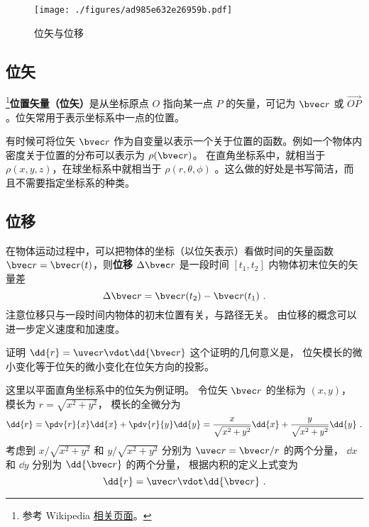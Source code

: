 

\begin{figure}[ht]
\centering
\texttt{[image: ./figures/ad985e632e26959b.pdf]}
\caption{位矢与位移} \label{fig_Disp_1}
\end{figure}

\subsection{位矢}

\footnote{参考 Wikipedia \href{https://en.wikipedia.org/wiki/Position_(geometry)}{相关页面}。}\textbf{位置矢量（位矢）}是从坐标原点 $O$ 指向某一点 $P$ 的矢量，可记为 $\bvec r$ 或 $\overrightarrow{OP}$。位矢常用于表示坐标系中一点的位置。

有时候可将位矢 $\bvec r$ 作为自变量以表示一个关于位置的函数。例如一个物体内密度关于位置的分布可以表示为 $\rho(\bvec r)$。 在直角坐标系中，就相当于 $\rho(x,y,z)$，在球坐标系中就相当于 $\rho(r,\theta,\phi)$ 。这么做的好处是书写简洁，而且不需要指定坐标系的种类。

\subsection{位移}
在物体运动过程中，可以把物体的坐标（以位矢表示）看做时间的矢量函数 $\bvec r=\bvec r(t)$，则\textbf{位移} $\Delta \bvec r$ 是一段时间 $[t_1,t_2]$ 内物体初末位矢的矢量差
\begin{equation}
\Delta \bvec r = \bvec r(t_2) - \bvec r(t_1)~.
\end{equation}
注意位移只与一段时间内物体的初末位置有关，与路径无关。 由位移的概念可以进一步定义速度和加速度。

\begin{example}{证明 $\dd{r} = \uvec r \vdot \dd{\bvec r}$}\label{ex_Disp_1}
这个证明的几何意义是， 位矢模长的微小变化等于位矢的微小变化在位矢方向的投影。

这里以平面直角坐标系中的位矢为例证明。 令位矢 $\bvec r$ 的坐标为 $(x, y)$， 模长为 $r = \sqrt{x^2 + y^2}$，
模长的全微分为
\begin{equation}
\dd{r} = \pdv{r}{x} \dd{x} + \pdv{r}{y} \dd{y} = \frac{x}{\sqrt{x^2 + y^2}} \dd{x} + \frac{y}{\sqrt{x^2 + y^2}} \dd{y}~.
\end{equation}
考虑到 $x/\sqrt{x^2 + y^2}$ 和 $y/\sqrt{x^2 + y^2}$ 分别为 $\uvec r = \bvec r/r$ 的两个分量， $\dd{x}$ 和 $\dd{y}$ 分别为 $\dd{\bvec r}$ 的两个分量， 根据内积的定义上式变为
\begin{equation}
\dd{r} = \uvec r \vdot \dd{\bvec r}~.
\end{equation}
\end{example}
